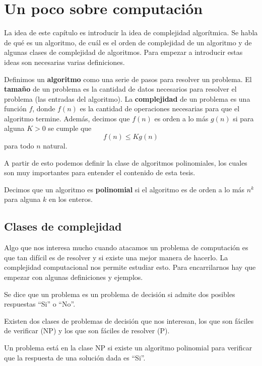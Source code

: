 \chapter{Un poco sobre computación}

La idea de este capítulo es introducir la idea de complejidad algorítmica. Se habla de qué es un algoritmo, de cuál es el orden de complejidad de un algoritmo y de algunas clases de complejidad de algoritmos. Para empezar a introducir estas ideas son necesarias varias definiciones. 

\begin{dfn} \cite{Ramon}
Definimos un \textbf{algoritmo} como una serie de pasos para resolver un problema. El \textbf{tamaño} de un problema es la cantidad de datos necesarios para resolver el problema (las entradas del algoritmo). La \textbf{complejidad} de un problema es una función $f$, donde $f(n)$ es la cantidad de operaciones necesarias para que el algoritmo termine. Además, decimos que $f(n)$ es orden a lo más $g(n)$ si para alguna $K>0$ se cumple que
$$f(n) \leq Kg(n)$$
para todo $n$ natural.
\end{dfn}

A partir de esto podemos definir la clase de algoritmos polinomiales, los cuales son muy importantes para entender el contenido de esta tesis. 

\begin{dfn}
Decimos que un algoritmo es \textbf{polinomial} si el algoritmo es de orden a lo más $n^k$ para alguna $k$ en los enteros. 
\end{dfn}


\section{Clases de complejidad}
Algo que nos interesa mucho cuando atacamos un problema de computación es que tan difícil es de resolver y si existe una mejor manera de hacerlo. La complejidad computacional nos permite estudiar esto. Para encarrilarnos hay que empezar con algunas definiciones y ejemplos.
\begin{dfn}
Se dice que un problema es un problema de decisión si admite dos posibles respuestas ``Si'' o ``No''. 
\end{dfn}
Existen dos clases de problemas de decisión que nos interesan, los que son fáciles de verificar (NP) y los que son fáciles de resolver (P).
\begin{dfn}
Un problema está en la clase NP si existe un algoritmo polinomial para verificar que la respuesta de una solución dada es ``Si''.
\end{dfn}

